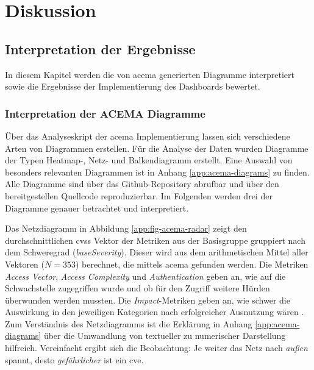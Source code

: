 \chapter{Diskussion}
\label{chap:diskussion}
\section{Interpretation der Ergebnisse}
\label{sec:interpretation}
In diesem Kapitel werden die von \gls{acema} generierten Diagramme interpretiert sowie die Ergebnisse der Implementierung des Dashboards bewertet.
\subsection{Interpretation der ACEMA Diagramme}
\label{sec:interpretation-acema}
Über das Analyseskript der \gls{acema} Implementierung lassen sich verschiedene Arten von Diagrammen erstellen. Für die Analyse der Daten wurden Diagramme der Typen Heatmap-, Netz- und Balkendiagramm erstellt. Eine Auswahl von besonders relevanten Diagrammen ist in Anhang \ref{app:acema-diagrams} zu finden. Alle Diagramme sind über das Github-Repository \autocite{jesseDumpeldownAcema_oranDev} abrufbar und über den bereitgestellen Quellcode reproduzierbar. Im Folgenden werden drei der Diagramme genauer betrachtet und interpretiert.
\par Das Netzdiagramm in Abbildung \ref{app:fig-acema-radar} zeigt den durchschnittlichen \gls{cvss} Vektor der Metriken aus der Basisgruppe gruppiert nach dem Schweregrad (\textit{baseSeverity}). Dieser wird aus dem arithmetischen Mittel aller Vektoren (\(N = 353\)) berechnet, die mittels \gls{acema} gefunden werden. Die Metriken \textit{Access Vector}, \textit{Access Complexity} und \textit{Authentication} geben an, wie auf die Schwachstelle zugegriffen wurde und ob für den Zugriff weitere Hürden überwunden werden mussten. Die \textit{Impact}-Metriken geben an, wie schwer die Auswirkung in den jeweiligen Kategorien nach erfolgreicher Ausnutzung wären \autocite{CVSSV2Complete}. Zum Verständnis des Netzdiagramms ist die Erklärung in Anhang \ref{app:acema-diagrams} über die Umwandlung von textueller zu numerischer Darstellung hilfreich. Vereinfacht ergibt sich die Beobachtung: Je weiter das Netz nach \textit{außen} spannt, desto \textit{gefährlicher} ist ein \gls{cve}.
